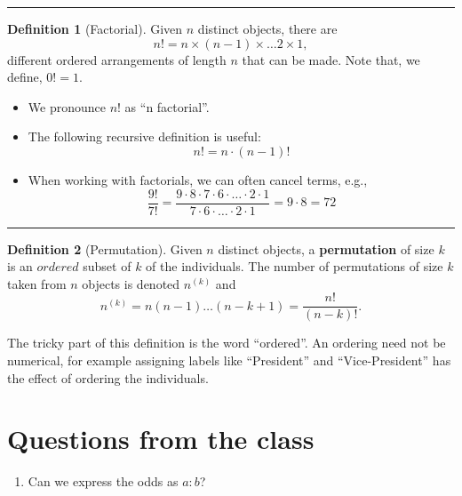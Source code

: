 \documentclass[
]{book}
\providecommand{\tightlist}{%
  \setlength{\itemsep}{0pt}\setlength{\parskip}{0pt}}
\theoremstyle{definition}
\newtheorem{definition}{Definition}[chapter]
\theoremstyle{definition}
\theoremstyle{definition}
\theoremstyle{definition}
\theoremstyle{remark}
\begin{document}
\begin{center}\rule{0.5\linewidth}{0.5pt}\end{center}

\begin{definition}[Factorial]
Given \(n\) distinct objects, there are
\[
n! = n \times (n-1) \times \ldots 2 \times 1,
\]
different ordered arrangements of length \(n\) that can be made. Note that, we define, \(0! = 1\).
\end{definition}

\begin{itemize}
\tightlist
\item
  We pronounce \(n!\) as ``n factorial''.
\item
  The following recursive definition is useful:
  \[ 
  n! = n \cdot (n-1)!
  \]

  \item

  When working with factorials, we can often cancel terms, e.g.,
  \[ \frac{9!}{7!} = \frac{9\cdot 8 \cdot 7\cdot 6 \cdot \dots \cdot 2 \cdot 1}{7\cdot 6 \cdot \dots \cdot 2 \cdot 1}=9\cdot 8 = 72\]
\end{itemize}

\begin{center}\rule{0.5\linewidth}{0.5pt}\end{center}

\begin{definition}[Permutation]
Given \(n\) distinct objects, a \textbf{permutation} of size \(k\) is an \(ordered\) subset of \(k\) of the individuals. The number of permutations of size \(k\) taken from \(n\) objects is denoted \(n^{(k)}\) and
\[
n^{(k)}=n(n-1)\dots (n-k+1) =\frac{n!}{(n-k)!}.
\]
\end{definition}

The tricky part of this definition is the word ``ordered''. An ordering need not be numerical, for example assigning labels like ``President'' and ``Vice-President'' has the effect of ordering the individuals.

\hypertarget{questions-from-the-class-1}{%
\section{Questions from the class}\label{questions-from-the-class-1}}

\begin{enumerate}
\def\labelenumi{\arabic{enumi}.}
\tightlist
\item
  Can we express the odds as \(a:b\)?
\end{enumerate}
\end{document}
